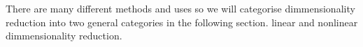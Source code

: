 There are many different methods and uses so we will categorise dimmensionality reduction into two general categories in the following section. linear and nonlinear dimmensionality reduction.










